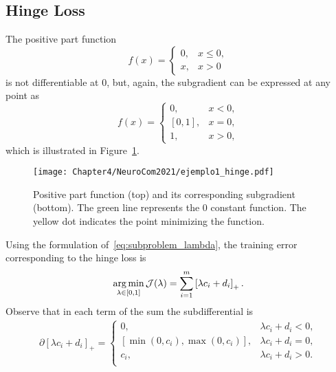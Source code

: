 \subsection{Hinge Loss}
The positive part function 
\begin{equation}
    \nonumber
    f(x) = 
    \begin{cases}
    0 ,& x \leq 0, \\
    x ,& x > 0    
    \end{cases}
\end{equation}
is not differentiable at $0$, but, again, the subgradient can be expressed at any point as
\begin{equation}
    \nonumber
    f(x) = 
    \begin{cases}
    0 ,& x < 0, \\
    [0, 1] ,& x = 0 , \\
    1 ,& x > 0 ,
    \end{cases}
\end{equation}
which is illustrated in Figure~\ref{fig:hinge_loss}.
\begin{figure}[t!]
    \centering
    \texttt{[image: Chapter4/NeuroCom2021/ejemplo1\_hinge.pdf]}
    \caption{Positive part function (top) and its corresponding subgradient (bottom). The green line represents the $0$ constant function. The yellow dot indicates the point minimizing the function.}
    \label{fig:hinge_loss}
\end{figure}
Using the formulation of~\eqref{eq:subproblem_lambda}, the training error corresponding to the hinge loss is
\begin{equation}
    \label{eq:opt_hinge_l1}
    \argmin_{\lambda \in [0, 1]} \mathcal{J}(\lambda) = \sum_{i=1}^{\npertask} \pospart{\lambda c_i + d_i}.
\end{equation}
Observe that in each term of the sum the subdifferential is 
\begin{equation}
    \label{eq:subdiff_hinge_l1}
    \begin{aligned}
        \partial \left[\lambda c_i + d_i \right]_+ = 
    \begin{cases}
        0 ,& \lambda c_i + d_i  < 0, \\
        [\min(0, c_i), \max(0, c_i)] ,& \lambda c_i + d_i  = 0, \\
        c_i ,& \lambda c_i + d_i  > 0. \\
    \end{cases}
    \end{aligned}
\end{equation}
